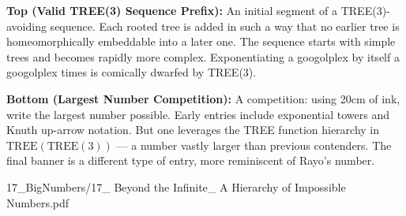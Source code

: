 \begin{SideNotePage}{
  \textbf{Top (Valid TREE(3) Sequence Prefix):}  
  An initial segment of a TREE(3)-avoiding sequence. Each rooted tree is added in such a way that no earlier tree is homeomorphically embeddable into a later one. The sequence starts with simple trees and becomes rapidly more complex. Exponentiating a googolplex by itself a googolplex times is comically dwarfed by TREE(3). \par

  \textbf{Bottom (Largest Number Competition):}  
  A competition: using 20cm of ink, write the largest number possible. Early entries include exponential towers and Knuth up-arrow notation. But one leverages the TREE function hierarchy in $\text{TREE}(\text{TREE}(3))$ — a number vastly larger than previous contenders. The final banner is a different type of entry, more reminiscent of Rayo's number. \par
}{17_BigNumbers/17_ Beyond the Infinite_ A Hierarchy of Impossible Numbers.pdf}
\end{SideNotePage}


